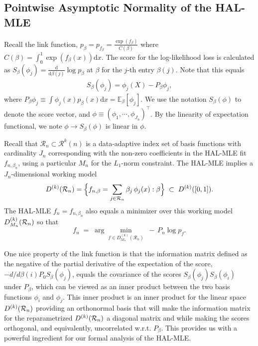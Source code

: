 \subsection{Pointwise Asymptotic Normality of the HAL-MLE}\label{subsect: Pointwise Asymptotic Normality of the HAL-MLE}
Recall the link function, $p_{\beta}=p_{f_{\beta}}=\frac{\exp(f_{\beta})}{C(\beta)}$ where $C(\beta)=\int_0^1 \exp(f_{\beta}(x)) \mathrm{d}x$. The score for the log-likelihood loss is calculated as $S_{\beta}(\phi_j)=\frac{\mathrm{d}}{\mathrm{d}\beta(j)}\log p_{\beta}$ at $\beta$ for the $j$-th entry $\beta(j)$. Note that this equals
\begin{align}
S_{\beta}(\phi_j)=\phi_j(X)- P_{\beta}\phi_j,
\end{align}
where $P_{\beta}\phi_j\equiv \int \phi_j(x)p_{\beta}(x) \mathrm{d}x = \mathbb{E}_{\beta}[\phi_j]$. We use the notation $S_{\beta}(\phi)$ to denote the score vector, and $\phi \equiv (\phi_1, \cdots, \phi_{J_n})^\top$. By the linearity of expectation functional, we note $\phi\rightarrow S_{\beta}(\phi)$ is linear in $\phi$. 

Recall that \(\mathcal R_n\subset \mathcal{R}^k(n)\) is a data‐adaptive index set of basis functions with cardinality $J_n$ corresponding with the non-zero coefficients in the HAL-MLE fit $f_{n,\beta_n}$, using a particular  $M_n$ for the $L_1$-norm constraint. The HAL-MLE implies a $J_n$-dimensional working model
\[
D^{(k)}(\mathcal R_n)
= \Bigl\{f_{n,\beta}=\sum_{j\in\mathcal R_n}\beta_j\,\phi_j(x):\beta\Bigr\}
\;\subset\;D^{(k)}([0,1]).
\]
The HAL‐MLE $f_n=f_{n,\beta_n}$ also equals a minimizer over this working model $D^{(k)}_{M_n}({\cal R}_n)$ so that
\[
f_n \;=\;\arg\min_{f\in D^{(k)}_{M_n}(\mathcal R_n)}\;-\,P_n\log p_f .
\]

One nice property of the link function is that the information matrix defined as the negative of the partial derivative of the expectation of the score, $-d/d\beta(i) P_0 S_{\beta}(\phi_j)$, equals the covariance of the scores $S_{\beta}(\phi_j)S_{\beta}(\phi_i)$ under $P_{\beta}$, which can be viewed as an inner product between the two basis functions $\phi_i$ and $\phi_j$. This inner product is an inner product for the linear space $D^{(k)}({\cal R}_n)$ providing an orthonormal basis that will make the information matrix for the reparametrized $D^{(k)}({\cal R}_n)$ a diagonal matrix and while making the scores orthogonal, and equivalently, uncorrelated w.r.t. $P_{\beta}$. This provides us with a powerful ingredient for our formal analysis of the HAL-MLE. 

